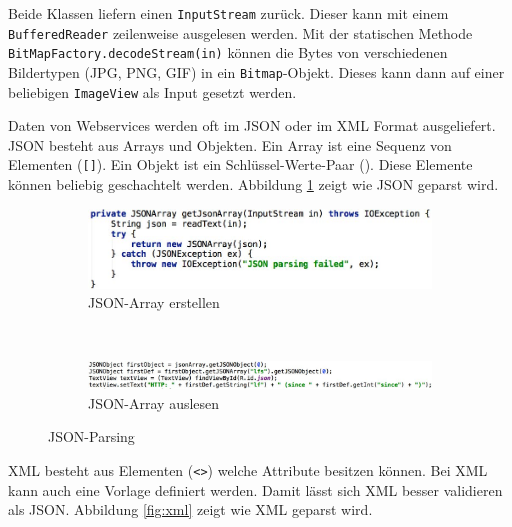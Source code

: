 Beide Klassen liefern einen \texttt{InputStream} zurück. Dieser kann mit einem \texttt{BufferedReader} zeilenweise ausgelesen werden. Mit der statischen Methode \texttt{BitMapFactory.decodeStream(in)} können die Bytes von verschiedenen Bildertypen (JPG, PNG, GIF) in ein \texttt{Bitmap}-Objekt. Dieses kann dann auf einer beliebigen \texttt{ImageView} als Input gesetzt werden.

Daten von Webservices werden oft im JSON oder im XML Format ausgeliefert. JSON besteht aus Arrays und Objekten. Ein Array ist eine Sequenz von Elementen (\texttt{[]}). Ein Objekt ist ein Schlüssel-Werte-Paar (\texttt{{}}). Diese Elemente können beliebig geschachtelt werden. Abbildung \ref{fig:json} zeigt wie JSON geparst wird.

\begin{figure}
	\centering
	\begin{subfigure}[b]{0.4\textwidth}
		\includegraphics[width=\textwidth]{fig/json-array-erstellen}
		\caption{JSON-Array erstellen}
	\end{subfigure}
	~
	\begin{subfigure}[b]{0.4\textwidth}
		\includegraphics[width=\textwidth]{fig/json-array-auslesen}
		\caption{JSON-Array auslesen}
	\end{subfigure}
	\caption{JSON-Parsing}
	\label{fig:json}
\end{figure}

XML besteht aus Elementen (\texttt{<>}) welche Attribute besitzen können. Bei XML kann auch eine Vorlage definiert werden. Damit lässt sich XML besser validieren als JSON. Abbildung \ref{fig:xml} zeigt wie XML geparst wird.

